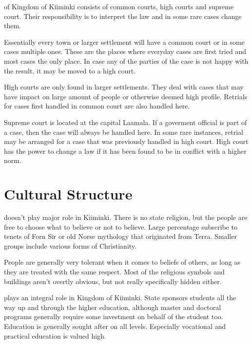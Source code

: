 \documentclass{tufte-book}
\begin{document}
 of Kingdom of Kiiminki consists of common courts,
high courts and supreme court. Their responsibility is to interpret the law
and in some rare cases change them.


Essentially every town or larger settlement will have a common court or in
some cases multiple ones. These are the places where everyday cases are first
tried and most cases the only place. In case any of the parties of the case is
not happy with the result, it may be moved to a high court.

High courts are only found in larger settlements. They deal with cases that
may have impact on large amount of people or otherwise deemed high profile.
Retrials for cases first handled in common court are also handled here.

Supreme court is located at the capital Laamala. If a goverment official is
part of a case, then the case will always be handled here. In some rare
instances, retrial may be arranged for a case that was previously handled in
high court. High court has the power to change a law if it has been found to
be in conflict with a higher norm.

\section{Cultural Structure}
\label{sc:cultural-structure}

 doesn't play major role in Kiiminki. There is no state
religion, but the people are free to choose what to believe or not to believe.
Large percentage subscribe to tenets of Forn Si\dh r or old Norse mythology
that originated from Terra. Smaller groups include various forms of
Christianity.

People are generally very tolerant when it comes to beliefs of others, as long
as they are treated with the same respect. Most of the religious symbols and
buildings aren't overtly obvious, but not really specifically hidden either.

 plays an integral role in Kingdom of Kiiminki. State
sponsors students all the way up and through the higher education, although
master and doctoral programs generally require some investment on behalf of
the student too. Education is generally sought after on all levels. Especially
vocational and practical education is valued high.
\end{document}
